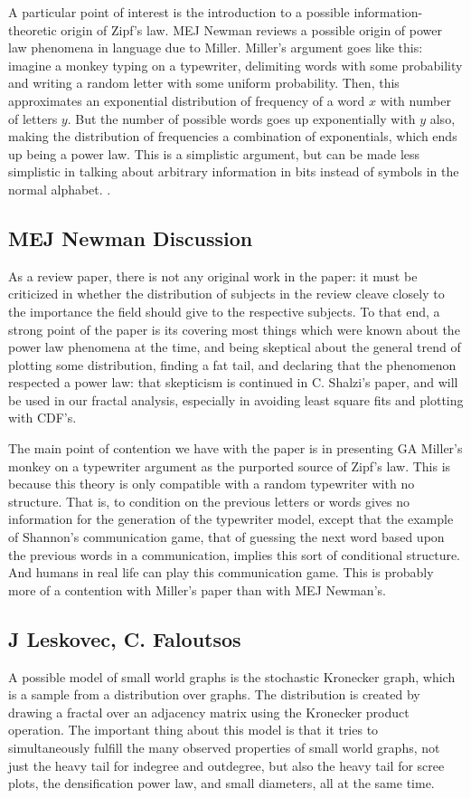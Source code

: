 \documentclass[12pt]{article}
\begin{document}
A particular point of interest is the introduction to a possible information-theoretic origin of Zipf's law. MEJ Newman reviews a possible origin of power law phenomena in language due to Miller\cite{gamiller}. Miller's argument goes like this: imagine a monkey typing on a typewriter, delimiting words with some probability and writing a random letter with some uniform probability. Then, this approximates an exponential distribution of frequency of a word $x$ with number of letters $y$. But the number of possible words goes up exponentially with $y$ also, making the distribution of frequencies a combination of exponentials, which ends up being a power law. This is a simplistic argument, but can be made less simplistic in talking about arbitrary information in bits instead of symbols in the normal alphabet.
. 
\subsection{MEJ Newman Discussion}

As a review paper, there is not any original work in the paper: it must be criticized in whether the distribution of subjects in the review cleave closely to the importance the field should give to the respective subjects. To that end, a strong point of the paper is its covering most things which were known about the power law phenomena at the time, and being skeptical about the general trend of plotting some distribution, finding a fat tail, and declaring that the phenomenon respected a power law: that skepticism is continued in C. Shalzi's paper\cite{cosma}, and will be used in our fractal analysis, especially in avoiding least square fits and plotting with CDF's.

The main point of contention we have with the paper is in presenting GA Miller's monkey on a typewriter argument as the purported source of Zipf's law. This is because this theory is only compatible with a random typewriter with no structure. That is, to condition on the previous letters or words gives no information for the generation of the typewriter model, except that the example of Shannon's communication game, that of guessing the next word based upon the previous words in a communication, implies this sort of conditional structure. And humans in real life can play this communication game. This is probably more of a contention with Miller's paper than with MEJ Newman's.

\subsection{J Leskovec, C. Faloutsos}
A possible model of small world graphs is the stochastic Kronecker graph, which is a sample from a distribution over graphs. The distribution is created by drawing a fractal over an adjacency matrix using the Kronecker product operation. The important thing about this model is that it tries to simultaneously fulfill the many observed properties of small world graphs, not just the heavy tail for indegree and outdegree, but also the heavy tail for scree plots, the densification power law, and small diameters, all at the same time.
\end{document}
